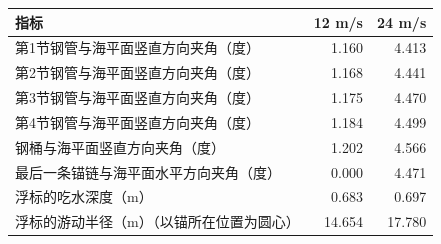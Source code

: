 \begin{tabular}{lrr}
\toprule
指标 & 12 m/s & 24 m/s \\ 
\midrule
第1节钢管与海平面竖直方向夹角（度） & 1.160 & 4.413 \\ 
第2节钢管与海平面竖直方向夹角（度） & 1.168 & 4.441 \\ 
第3节钢管与海平面竖直方向夹角（度） & 1.175 & 4.470 \\ 
第4节钢管与海平面竖直方向夹角（度） & 1.184 & 4.499 \\ 
钢桶与海平面竖直方向夹角（度） & 1.202 & 4.566 \\ 
最后一条锚链与海平面水平方向夹角（度） & 0.000 & 4.471 \\ 
浮标的吃水深度（m） & 0.683 & 0.697 \\ 
浮标的游动半径（m）（以锚所在位置为圆心） & 14.654 & 17.780 \\ 
\bottomrule
\end{tabular}
